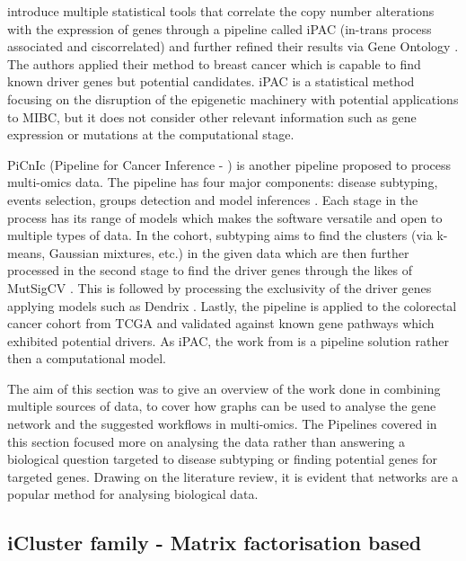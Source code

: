 \citet{Aure2013-je} introduce multiple statistical tools that correlate the copy number alterations with the expression of genes through a pipeline called iPAC (in-trans process associated and ciscorrelated) and further refined their results via Gene Ontology \citep{Carbon2018-ah}. The authors applied their method to breast cancer which is capable to find known driver genes but potential candidates. iPAC is a statistical method focusing on the disruption of the epigenetic machinery with potential applications to MIBC, but it does not consider other relevant information such as gene expression or mutations at the computational stage.


PiCnIc (Pipeline for Cancer Inference - \cite{Caravagna2016-vw}) is another pipeline proposed to process multi-omics data. The pipeline has four major components: disease subtyping, events selection, groups detection and model inferences \citep{Caravagna2016-vw}. Each stage in the process has its range of models which makes the software versatile and open to multiple types of data. In the cohort, subtyping aims to find the clusters (via k-means, Gaussian mixtures, etc.) in the given data which are then further processed in the second stage to find the driver genes through the likes of MutSigCV \citep{Lawrence2013-pl}. This is followed by processing the exclusivity of the driver genes applying models such as Dendrix \citep{Vandin2012-cf, Zhao2012-wj}. Lastly, the pipeline is applied to the colorectal cancer cohort from TCGA and validated against known gene pathways which exhibited potential drivers. As iPAC, the work from \cite{Caravagna2016-vw} is a pipeline solution rather then a computational model.

The aim of this section was to give an overview of the work done in combining multiple sources of data, to cover how graphs can be used to analyse the gene network and the suggested workflows in multi-omics. The Pipelines covered in this section focused more on analysing the data rather than answering a biological question targeted to disease subtyping or finding potential genes for targeted genes. Drawing on the literature review, it is evident that networks are a popular method for analysing biological data.

\subsection{iCluster family - Matrix factorisation based} \label{s:lit:iCluster}

